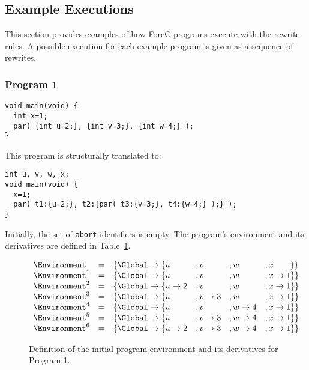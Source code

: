 \subsection{Example Executions}
This section provides examples of how ForeC programs
execute with the rewrite rules. A possible execution 
for each example program is given as a sequence of 
rewrites. 

\subsubsection{Program 1}
\begin{lstlisting}[style=snippet]
void main(void) {
  int x=1;
  par( {int u=2;}, {int v=3;}, {int w=4;} );
}
\end{lstlisting}
This program is structurally translated to:
\begin{lstlisting}[style=snippet]
int u, v, w, x;
void main(void) {
  x=1;
  par( t1:{u=2;}, t2:{par( t3:{v=3;}, t4:{w=4;} );} );
}
\end{lstlisting}
Initially, the set of \verb$abort$ identifiers \Abort{}
is empty. The program's environment \Environment{} and its
derivatives are defined in Table~\ref{figure:forec_program_1}.
\newline

\begin{figure}
	\centering
	$$\begin{array}{l l l l l l l}
		 \Environment		&=& \lbrace \Global \to \lbrace u		&, v		&, w		&, x~~~~~~ \rbrace \rbrace	\\
		 \Environment^1		&=& \lbrace \Global \to \lbrace u		&, v		&, w		&, x \to 1 \rbrace \rbrace	\\
		 \Environment^2		&=& \lbrace \Global \to \lbrace u \to 2	&, v		&, w		&, x \to 1 \rbrace \rbrace	\\
		 \Environment^3		&=& \lbrace \Global \to \lbrace u 		&, v \to 3	&, w		&, x \to 1 \rbrace \rbrace	\\
		 \Environment^4		&=& \lbrace \Global \to \lbrace u 		&, v		&, w \to 4	&, x \to 1 \rbrace \rbrace	\\
		 \Environment^5		&=& \lbrace \Global \to \lbrace u 		&, v \to 3	&, w \to 4	&, x \to 1 \rbrace \rbrace	\\
		 \Environment^6		&=& \lbrace \Global \to \lbrace u \to 2 &, v \to 3	&, w \to 4	&, x \to 1 \rbrace \rbrace
	\end{array}$$
	
	\caption{Definition of the initial program environment and its derivatives for Program 1.}
	\label{figure:forec_program_1}
\end{figure}

